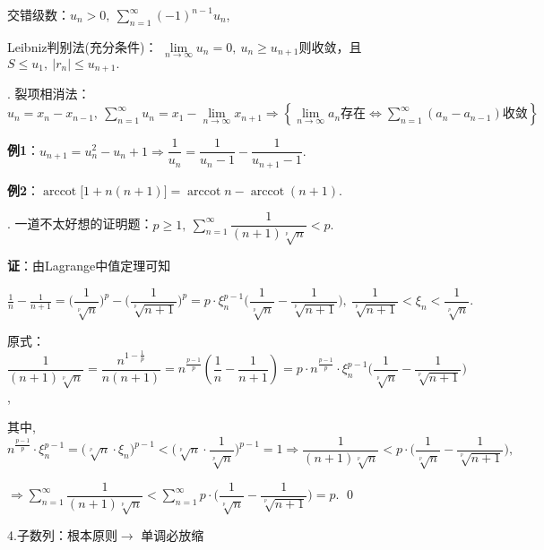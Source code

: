 \documentclass[UTF8]{ctexart}
\newcommand\no{\noindent}
\newcommand\dis{\displaystyle}
\newcommand\ls{\leqslant}
\newcommand\gs{\geqslant}
\newcommand\limn{\dis\lim\limits_{n\to\infty}}
\newcommand\sumn{\dis\sum\limits_{n=1}^{\infty}}
\DeclareMathOperator{\arccot}{arccot}
\begin{document}
\begin{spacing}{2}
交错级数：$u_n>0,\ \sumn(-1)^{n-1}u_n$, 

Leibniz判别法(充分条件)：
$\limn u_n=0,\ u_n\gs u_{n+1}$则收敛，且$S\ls u_1,\ |r_n|\ls u_{n+1}.$

\vspace{0.3cm}

\no2. \textcolor[rgb]{1,0,0}{裂项相消法}：$u_n=x_n-x_{n-1},\ \sumn u_n=x_1-\limn x_{n+1}
\Longrightarrow\left\{\limn a_n\text{存在}\Longleftrightarrow\sumn(a_n-a_{n-1})
\text{收敛}\right\}$

\vspace{0.3cm}

\textbf{例1}：$u_{n+1}=u_n^2-u_n+1\Longrightarrow\dfrac{1}{u_n}
=\dfrac{1}{u_n-1}-\dfrac{1}{u_{n+1}-1}.$

\textbf{例2}：$\arccot\big[1+n(n+1)\big]=\arccot n-\arccot (n+1).$

\no3. 一道不太好想的证明题：$p\gs1,\ \sumn\dfrac{1}{(n+1)\sqrt[^p\!]{n}}<p.$

\textbf{证}：由Lagrange中值定理可知

$\dis\frac{1}{n}-\frac{1}{n+1}
=\Bigg(\dfrac{1}{\sqrt[^p\!]{n}}\Bigg)^p-\Bigg(\dfrac{1}{\sqrt[^p\!]{n+1}}\Bigg)^p
=p\cdot\xi_n^{p-1}\Bigg(\dfrac{1}{\sqrt[^p\!]{n}}-\dfrac{1}{\sqrt[^p\!]{n+1}}\Bigg),\ 
\dfrac{1}{\sqrt[^p\!]{n+1}}<\xi_n<\dfrac{1}{\sqrt[^p\!]{n}}.$

\vspace{0.3cm}

原式：$\dfrac{1}{(n+1)\sqrt[^p\!]{n}}=\dfrac{n^{1-\tfrac{1}{p}}}{n(n+1)}
=n^{\tfrac{p-1}{p}}\left(\dfrac{1}{n}-\dfrac{1}{n+1}\right)
=p\cdot n^{\tfrac{p-1}{p}}\cdot\xi_n^{p-1}\Bigg(\dfrac{1}{\sqrt[^p\!]{n}}-\dfrac{1}{\sqrt[^p\!]{n+1}}\Bigg)$,

\vspace{0.3cm}

其中, $n^{\tfrac{p-1}{p}}\cdot\xi_n^{p-1}=\Big(\sqrt[^p\!]{n}\cdot\xi_n\Big)^{p-1}<
\Bigg(\sqrt[^p\!]{n}\cdot\dfrac{1}{\sqrt[^p\!]{n}}\Bigg)^{p-1}=1
\Longrightarrow\dfrac{1}{(n+1)\sqrt[^p\!]{n}}<p\cdot
\Bigg(\dfrac{1}{\sqrt[^p\!]{n}}-\dfrac{1}{\sqrt[^p\!]{n+1}}\Bigg),$

\vspace{0.3cm}

$\Longrightarrow\sumn\dfrac{1}{(n+1)\sqrt[^p\!]{n}}
<\sumn p\cdot\Bigg(\dfrac{1}{\sqrt[^p\!]{n}}-\dfrac{1}{\sqrt[^p\!]{n+1}}\Bigg)=p.$
\qed

\vspace{0.3cm}

\no4.子数列：根本原则$\longrightarrow$ \textcolor[rgb]{1,0,0}{单调必放缩}


\end{spacing}
\end{document}
